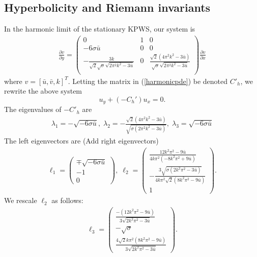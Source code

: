 \documentclass[12pt]{article}
\newcommand{\AG}[1]{{\color{Green} (#1)}}
\numberwithin{equation}{section}
\begin{document}
\subsection{Hyperbolicity and Riemann invariants}
\label{sec:hyperb-riem-invar-1}

In the harmonic limit of the stationary KPWS, our system is 
\begin{align}
    \frac{\partial v}{\partial y} = \left(
\begin{array}{ccc}
 0 & 1 & 0 \\
 -6 \sigma \bar u & 0 & 0 \\
 -\frac{3 k}{\sqrt{2} \sqrt{\sigma} \sqrt{2 \pi ^2 k^2-3 \bar u}} & 0 & \frac{\sqrt{2} \left(4 \pi ^2 k^2-3
   \bar u\right)}{\sqrt{\sigma} \sqrt{2 \pi ^2 k^2-3 \bar u}} \\ \label{harmonicpde}
\end{array}
\right) \frac{\partial v}{\partial x}
\end{align}
where $v = [\bar u, \bar v, k]^T$. Letting the matrix in (\ref{harmonicpde}) be denoted $C'_h$, we rewrite the above system $$u_y+(-C_h')u_x=0.$$ The eigenvalues of $-C'_h$ are 
\begin{align}
    \lambda_{1} = -\sqrt{-6\sigma \bar u}, \; \lambda_2 = -\frac{\sqrt{2} \left(4 \pi ^2 k^2-3
   \bar u\right)}{ \sqrt{\sigma(2 \pi ^2 k^2-3 \bar u)}}, \; \lambda_3 = \sqrt{-6\sigma \bar u}
\end{align}
The left eigenvectors are \AG{Add right eigenvectors}
\begin{align}
    \ell_{1} = \left(\begin{array}{c}
         \mp \sqrt{-6\sigma \bar u}  \\
         -1 \\
         0
    \end{array}\right), \;
    \ell_2 =\left(
\begin{array}{c}
 \frac{12k^2\pi^2-9\bar u}{4k\pi^2(-8k^2\pi^2 + 9\bar u)} \\
 -\frac{3\sqrt{\sigma(2k^2\pi^2-3 \bar u)}}{4k\pi^2\sqrt{2}(8k^2\pi^2-9\bar u) } \\
 1
\end{array}
\right).
\end{align}
We rescale $\ell_2$ as follows:
\begin{align}
    \ell_3 = \left(
\begin{array}{c}
 \frac{-(12k^2\pi^2-9\bar u)}{3\sqrt{2k^2\pi^2-3\bar u}} \\
 -\sqrt{\sigma} \\
 \frac{4\sqrt{2}k\pi^2(8k^2\pi^2-9\bar u)}{3\sqrt{2k^2\pi^2-3\bar u}}
\end{array}
\right).
\end{align}
\end{document}
